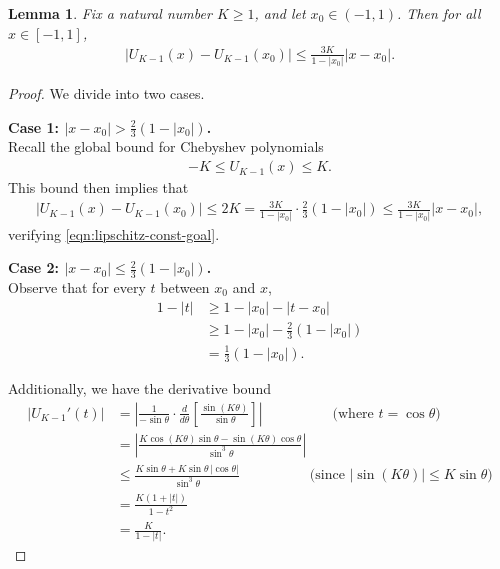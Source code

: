 \documentclass[10pt,a4paper]{amsart}
\providecommand{\lrabs}[1]{\!\left\lvert #1 \right\lvert}
\providecommand{\lrb}[1]{\!\left[#1\right]}
\theoremstyle{plain}
\newtheorem{lemma}[theorem]{Lemma}
\theoremstyle{definition}
\numberwithin{equation}{section}
\numberwithin{figure}{section}
\numberwithin{table}{section}
\begin{document}
\setcounter{section}{2}
\setcounter{theorem}{8}
\begin{lemma} \label{lem:lipschitz-const-at-x0-for-U}
    Fix a natural number $K \ge 1$, and let $x_0 \in (-1,1)$. Then for all $x \in [-1,1]$,
    \begin{align}
        \label{eqn:lipschitz-const-goal}
        |U_{K-1}(x) - U_{K-1}(x_0)| \le \frac{3K}{1-|x_0|} |x-x_0|.
    \end{align}
\end{lemma}

\begin{proof}
We divide into two cases.

\textbf{Case 1: $|x-x_0| > \frac{2}{3} (1-|x_0|)$. \\}
Recall the global bound for Chebyshev polynomials
\begin{align}
    -K \le U_{K-1}(x) \le K.
\end{align}
This bound then implies that
\begin{align}
    |U_{K-1}(x)-U_{K-1}(x_0)| \le 2K = \frac{3K}{1-|x_0|} \cdot \frac{2}{3} (1-|x_0|) \le \frac{3K}{1-|x_0|} |x-x_0|,
\end{align}
verifying \eqref{eqn:lipschitz-const-goal}.


\textbf{Case 2: $|x-x_0| \le \frac{2}{3} (1-|x_0|)$. \\}
Observe that for every $t$ between $x_0$ and $x$, 
\begin{align}
    1-|t|
    &\ge
    1-|x_0|-|t-x_0| \\
    &\ge
    1-|x_0|-\frac{2}{3}(1-|x_0|) \\
    &=
    \frac{1}{3}(1-|x_0|).
    \label{eq:xi-away-from-endpoint}
\end{align}


Additionally, we have the derivative bound
\begin{align}
    |U_{K-1}'(t)|
    &=
    \lrabs{
        \frac{1}{-\sin \theta}
        \cdot
        \frac{d}{d\theta}
        \lrb{
            \frac{\sin(K\theta)}{\sin \theta}
        }
    } \qquad \qquad\quad
    \text{(where $t=\cos \theta$)}
    \\
    &=
    \lrabs{
    \frac{
        K\cos(K\theta)\sin\theta
        -
        \sin(K\theta)\cos\theta
    }{\sin^3\theta}
    } \\
    &\le
    \frac{
        K\sin\theta
        +
        K\sin\theta\,|\cos\theta|
    }{\sin^3\theta}
    \qquad\qquad\quad
    \text{(since $|\sin(K\theta)|\le K\sin\theta$)}
    \\
    &=
    \frac{K(1+|t|)}{1-t^2} \\
    &=
    \frac{K}{1-|t|}.
    \label{eq:U-derivative-bound}
\end{align}




\end{proof}
\end{document}
